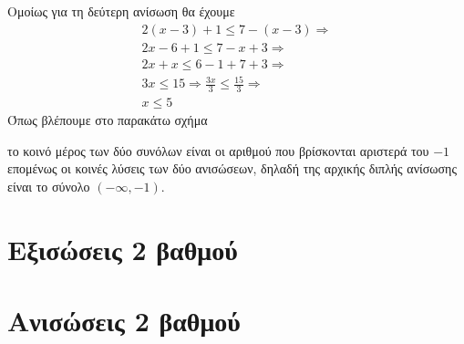 Ομοίως για τη δεύτερη ανίσωση θα έχουμε
\begin{gather*}
2(x-3)+1\leq 7-(x-3)\Rightarrow\\
2x-6+1\leq 7-x+3\Rightarrow\\
2x+x\leq 6-1+7+3\Rightarrow\\
3x\leq 15\Rightarrow \frac{3x}{3}\leq \frac{15}{3}\Rightarrow\\
x\leq 5
\end{gather*}
 Όπως βλέπουμε στο παρακάτω σχήμα
\begin{center}
\end{center}
το κοινό μέρος των δύο συνόλων είναι οι αριθμού που βρίσκονται αριστερά του $ -1 $ επομένως οι κοινές λύσεις των δύο ανισώσεων, δηλαδή της αρχικής διπλής ανίσωσης είναι το σύνολο $ (-\infty,-1) $.\\
\section{Εξισώσεις 2 βαθμού}
\section{Ανισώσεις 2 βαθμού}

